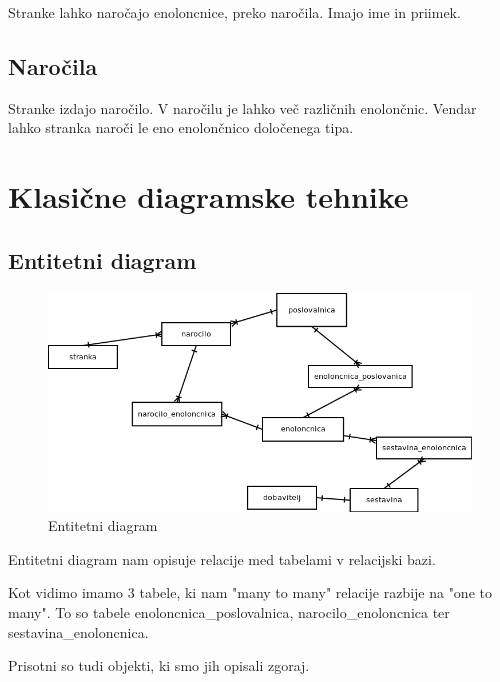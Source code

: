 \documentclass[12pt]{article}
\let\stdsection\section
\renewcommand\section{\newpage\stdsection}
\begin{document}
Stranke lahko naročajo enoloncnice, preko naročila.
Imajo ime in priimek.

\subsection{Naročila}

Stranke izdajo naročilo. V naročilu je lahko več različnih enolončnic. Vendar lahko stranka naroči le eno enolončnico določenega tipa.


\section{Klasične diagramske tehnike}

\subsection{Entitetni diagram}

\begin{figure}[htb]
\begin{center}
\includegraphics[scale=0.5]{entitetni.png}
\end{center}
\caption{Entitetni diagram}
\label{entitetni}
\end{figure}


Entitetni diagram nam opisuje relacije med tabelami v relacijski bazi. 

Kot vidimo imamo 3 tabele, ki nam "many to many" relacije razbije na "one to many". To so tabele enoloncnica\_poslovalnica, narocilo\_enoloncnica ter sestavina\_enoloncnica.

Prisotni so tudi objekti, ki smo jih opisali zgoraj.

\end{document}
